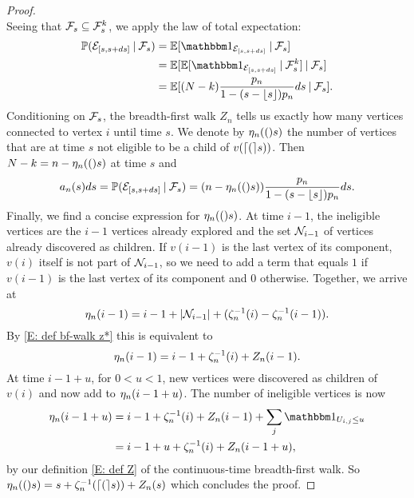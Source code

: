 \begin{proof}
\begin{equation}
	\end{equation}
	Seeing that $\mathcal{F}_s \subseteq \mathcal{F}_s^k$,
	we apply the law of total expectation:
	\begin{equation}
	\begin{aligned}
	\Prob(\NewEdge{[s,s+ds]} \cond \SigmaAlgebra_s)
	&= \Exp{\Ind{\NewEdge{[s,s+ds]}} \cond \SigmaAlgebra_s} \\
	&= \Exp{ \Exp{\Ind{\NewEdge{[s,s+ds]}} \cond \SigmaAlgebra_s^k} \cond \SigmaAlgebra_s} \\
	&= \Exp{ (N-k) \ps ds \cond \SigmaAlgebra_s}.
	\end{aligned}
	\end{equation}
	Conditioning on $\mathcal{F}_s$,
	the breadth-first walk $Z_n$ tells us exactly how many vertices connected to vertex $i$ until time $s$.
	We denote by $\eta_n(()s)$ the number of vertices that are at time $s$ not eligible to be a child of $v(\lceil(\rceil s))$.
	Then $N-k=n-\eta_n(()s)$ at time $s$ and
	\begin{equation}
	a_n(s)ds = \mathbb{P}(\mathcal{E}_{[s, s+ds]} \: | \: \mathcal{F}_s) = (n - \eta_n(()s)) \frac{p_n}{1-(s-\lfloor s\rfloor)p_n} ds.
	\end{equation}
	Finally, we find a concise expression for $\eta_n(()s)$.
	At time $i-1$, the ineligible vertices are the $i-1$ vertices already explored
	and the set $\mathcal{N}_{i-1}$ of vertices already discovered as children.
	If $v(i-1)$ is the last vertex of its component,
	$v(i)$ itself is not part of $\mathcal{N}_{i-1}$, 
	so we need to add a term that equals $1$ if $v(i-1)$ is the last vertex of its component and $0$ otherwise.
	Together, we arrive at
	\begin{equation}
	\eta_n(i-1) = i-1 + |\mathcal{N}_{i-1}| + (\zeta^{-1}_n(i) - \zeta^{-1}_n(i-1)).
	\end{equation}
	By \eqref{E: def bf-walk z*} this is equivalent to
	\begin{equation}
	\eta_n(i-1) = i-1 + \zeta^{-1}_n(i) + Z_n(i-1).
	\end{equation}
	At time $i-1+u$, for $0<u<1$, 
	new vertices were discovered as children of $v(i)$ and now add to $\eta_n(i-1+u)$.
	The number of ineligible vertices is now
	\begin{equation}
	\begin{aligned}
	\Ineligible{i-1+u} 
	&= i-1 + \ZetaMinus{i} + \Zn(i-1) + \sum_{j} \Ind{\Uij \leq u} \\
	&= i-1+u + \ZetaMinus{i} + \Zn(i-1+u),
	\end{aligned}
	\end{equation} 
	by our definition \eqref{E: def Z} of the continuous-time breadth-first walk.
	So $\eta_n(()s) = s + \zeta^{-1}_n(\lceil(\rceil s)) + Z_n(s)$ which concludes the proof.
\end{proof}

